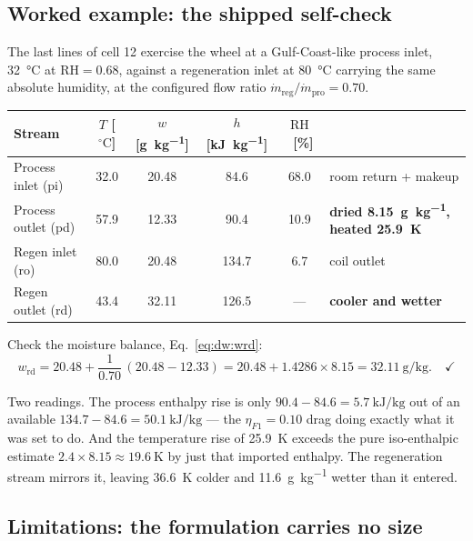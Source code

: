 \documentclass[11pt]{article}
\newcommand{\mdp}{\ensuremath{\dot m_{\mathrm{pro}}}}
\newcommand{\mdr}{\ensuremath{\dot m_{\mathrm{reg}}}}
\newcommand{\RH}{\ensuremath{\mathrm{RH}}}
\newcommand{\degC}{\ensuremath{^{\circ}\mathrm{C}}}
\begin{document}
\subsection{Worked example: the shipped self-check}
\label{sec:dw:example}

The last lines of cell 12 exercise the wheel at a Gulf-Coast-like process
inlet, \SI{32}{\degreeCelsius} at $\RH=0.68$, against a regeneration inlet at
\SI{80}{\degreeCelsius} carrying the same absolute humidity, at the
configured flow ratio $\mdr/\mdp=0.70$.

\begin{center}
\begin{tabular}{@{}lccccl@{}}
\toprule
Stream & $T$ [\degC] & $w$ [\si{\gram\per\kilogram}]
       & $h$ [\si{\kilo\joule\per\kilogram}] & \RH\ [\%] & \\
\midrule
Process inlet  (pi) & 32.0 & 20.48 & \phantom{0}84.6 & 68.0 & room return + makeup \\
Process outlet (pd) & 57.9 & 12.33 & \phantom{0}90.4 & 10.9 & \textbf{dried \SI{8.15}{\gram\per\kilogram}, heated \SI{25.9}{\kelvin}} \\
Regen inlet    (ro) & 80.0 & 20.48 & 134.7 & \phantom{0}6.7 & coil outlet \\
Regen outlet   (rd) & 43.4 & 32.11 & 126.5 & --- & \textbf{cooler and wetter} \\
\bottomrule
\end{tabular}
\label{tab:dw:example}
\end{center}

Check the moisture balance, Eq.~\eqref{eq:dw:wrd}:
\begin{equation*}
w_{\mathrm{rd}} = 20.48 + \frac{1}{0.70}\,(20.48-12.33)
= 20.48 + 1.4286\times 8.15 = \SI{32.11}{\gram\per\kilogram}.\quad\checkmark
\end{equation*}

Two readings. The process enthalpy rise is only
$90.4-84.6=\SI{5.7}{\kilo\joule\per\kilogram}$ out of an available
$134.7-84.6=\SI{50.1}{\kilo\joule\per\kilogram}$ --- the $\eta_{F1}=0.10$ drag
doing exactly what it was set to do. And the temperature rise of
\SI{25.9}{\kelvin} exceeds the pure iso-enthalpic estimate $2.4\times
8.15\approx\SI{19.6}{\kelvin}$ by just that imported enthalpy. The
regeneration stream mirrors it, leaving \SI{36.6}{\kelvin} colder and
\SI{11.6}{\gram\per\kilogram} wetter than it entered.

\subsection{Limitations: the formulation carries no size}
\label{sec:dw:limitations}
\end{document}
